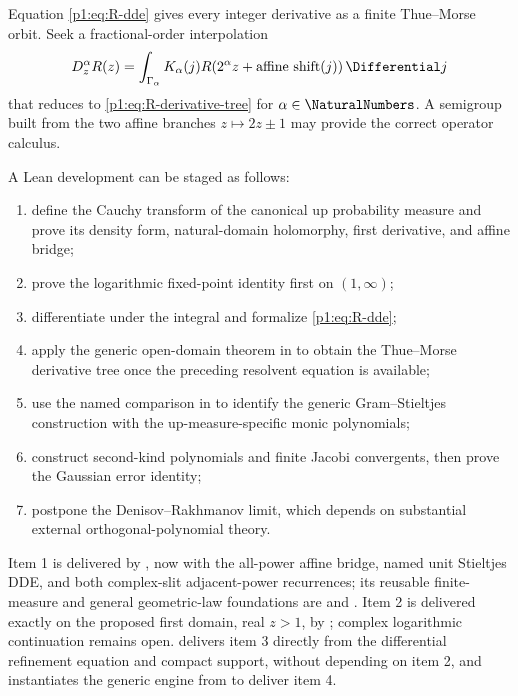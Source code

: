 \documentclass[11pt]{article}
\theoremstyle{definition}
\theoremstyle{remark}
\begin{document}
\begin{problem}
Equation \eqref{p1:eq:R-dde} gives every integer derivative as a finite Thue--Morse orbit.
Seek a fractional-order interpolation
\[
 D_z^{\alpha}R(z)=\int_{\Gamma_\alpha}K_\alpha(j)
 R(2^\alpha z+\text{affine shift}(j))\,\Differential j
\]
that reduces to \eqref{p1:eq:R-derivative-tree} for \(\alpha\in\NaturalNumbers\).  A semigroup built from
the two affine branches \(z\mapsto2z\pm1\) may provide the correct operator calculus.
\end{problem}

\begin{problem}
A Lean development can be staged as follows:
\begin{enumerate}
\item define the Cauchy transform of the canonical up probability measure and prove its
      density form, natural-domain holomorphy, first derivative, and affine bridge;
\item prove the logarithmic fixed-point identity first on \((1,\infty)\);
\item differentiate under the integral and formalize \eqref{p1:eq:R-dde};
\item apply the generic open-domain theorem in  to
      obtain the Thue--Morse derivative tree once the preceding resolvent equation is
      available;
\item use the named comparison in 
      to identify the generic Gram--Stieltjes construction with the
      up-measure-specific monic polynomials;
\item construct second-kind polynomials and finite Jacobi convergents, then
      prove the Gaussian error identity;
\item postpone the Denisov--Rakhmanov limit, which depends on substantial external
      orthogonal-polynomial theory.
\end{enumerate}
Item 1 is delivered by , now with the all-power affine bridge,
named unit Stieltjes DDE, and both complex-slit adjacent-power recurrences; its reusable
finite-measure and general geometric-law foundations are
 and .  Item 2 is
delivered exactly on the proposed first domain, real \(z>1\), by
; complex logarithmic continuation remains open.
 delivers item 3 directly from the differential
refinement equation and compact support, without depending on item 2, and instantiates
the generic engine from  to deliver item 4.


\end{problem}
\end{document}
